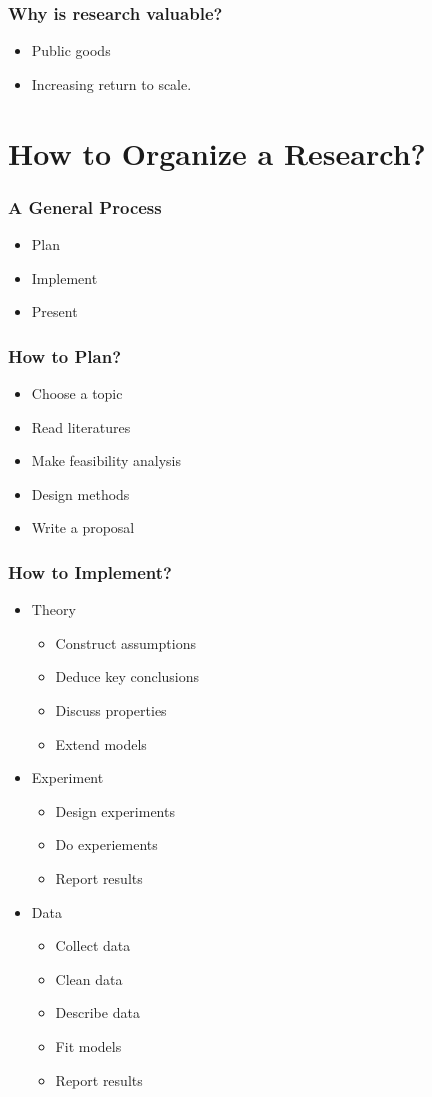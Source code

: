 \documentclass{beamer}
\begin{document}
\begin{frame}
\frametitle{Why is research valuable?}
\begin{itemize}
	\item Public goods
	\item Increasing return to scale.
\end{itemize}
\end{frame}

\section{How to Organize a Research?}
\begin{frame}
\frametitle{A General Process}
\begin{itemize}
	\item Plan
	\item Implement
	\item Present
\end{itemize}
\end{frame}

\begin{frame}
\frametitle{How to Plan?}
\begin{itemize}
	\item Choose a topic
	\item Read literatures
	\item Make feasibility analysis
	\item Design methods
	\item Write a proposal
\end{itemize}
\end{frame}

\begin{frame}[allowframebreaks]
\frametitle{How to Implement?}
\begin{itemize}
	\item Theory
	\begin{itemize}
		\item Construct assumptions
		\item Deduce key conclusions
		\item Discuss properties
		\item Extend models	
	\end{itemize}
	\item Experiment 
	\begin{itemize}
		\item Design experiments
		\item Do experiements
		\item Report results
	\end{itemize}
	\framebreak
	\item Data
	\begin{itemize}
		\item Collect data
		\item Clean data 
		\item Describe data 
		\item Fit models
		\item Report results
	\end{itemize}
\end{itemize}
\end{frame}
\end{document}
